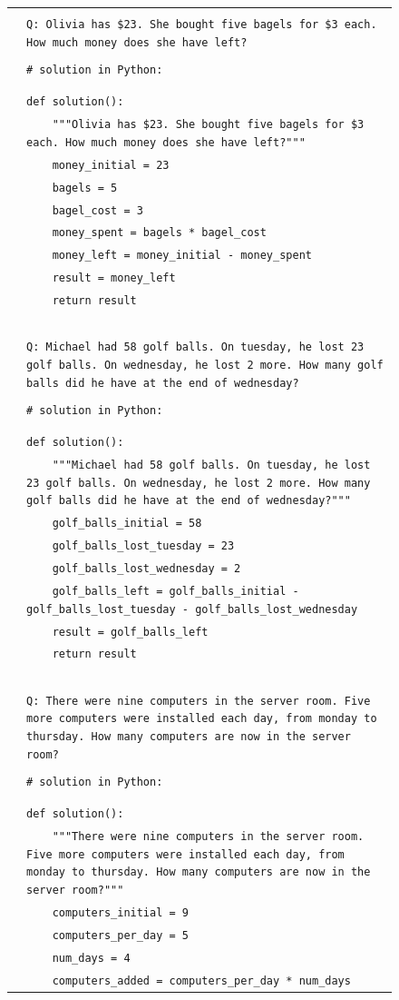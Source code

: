 { %

\newcommand{\pWidth}{5in}
\newcommand{\pStart}{\setcounter{pCount}{1}}
\newcommand{\pRow}[1]{\texttt{\fontsize{6pt}{1pt}\selectfont\color{gray}\arabic{pCount}}&\texttt{\fontsize{6pt}{1pt}\selectfont#1}\stepcounter{pCount}\\}
\newcommand{\pVar}[1]{\textbf{\{#1\}}}
\newcommand{\pBlank}{\_\_\_\_\_}
\begin{figure}[p]
\begin{center}\scriptsize
\begin{tabular}{|rp{\pWidth}|}\hline\pStart&\\
\pRow{Q: Olivia has \$23. She bought five bagels for \$3 each. How much money does she have left?}
\pRow{}
\pRow{\# solution in Python:}
\pRow{}
\pRow{}
\pRow{def solution():}
\pRow{\ \ \ \ """Olivia has \$23. She bought five bagels for \$3 each. How much money does she have left?"""}
\pRow{\ \ \ \ money\_initial = 23}
\pRow{\ \ \ \ bagels = 5}
\pRow{\ \ \ \ bagel\_cost = 3}
\pRow{\ \ \ \ money\_spent = bagels * bagel\_cost}
\pRow{\ \ \ \ money\_left = money\_initial - money\_spent}
\pRow{\ \ \ \ result = money\_left}
\pRow{\ \ \ \ return result}
\pRow{}
\pRow{}
\pRow{}
\pRow{}
\pRow{}
\pRow{Q: Michael had 58 golf balls. On tuesday, he lost 23 golf balls. On wednesday, he lost 2 more. How many golf balls did he have at the end of wednesday?}
\pRow{}
\pRow{\# solution in Python:}
\pRow{}
\pRow{}
\pRow{def solution():}
\pRow{\ \ \ \ """Michael had 58 golf balls. On tuesday, he lost 23 golf balls. On wednesday, he lost 2 more. How many golf balls did he have at the end of wednesday?"""}
\pRow{\ \ \ \ golf\_balls\_initial = 58}
\pRow{\ \ \ \ golf\_balls\_lost\_tuesday = 23}
\pRow{\ \ \ \ golf\_balls\_lost\_wednesday = 2}
\pRow{\ \ \ \ golf\_balls\_left = golf\_balls\_initial - golf\_balls\_lost\_tuesday - golf\_balls\_lost\_wednesday}
\pRow{\ \ \ \ result = golf\_balls\_left}
\pRow{\ \ \ \ return result}
\pRow{}
\pRow{}
\pRow{}
\pRow{}
\pRow{}
\pRow{Q: There were nine computers in the server room. Five more computers were installed each day, from monday to thursday. How many computers are now in the server room?}
\pRow{}
\pRow{\# solution in Python:}
\pRow{}
\pRow{}
\pRow{def solution():}
\pRow{\ \ \ \ """There were nine computers in the server room. Five more computers were installed each day, from monday to thursday. How many computers are now in the server room?"""}
\pRow{\ \ \ \ computers\_initial = 9}
\pRow{\ \ \ \ computers\_per\_day = 5}
\pRow{\ \ \ \ num\_days = 4}
\pRow{\ \ \ \ computers\_added = computers\_per\_day * num\_days}

\end{tabular}
\end{center}
\end{figure}}
